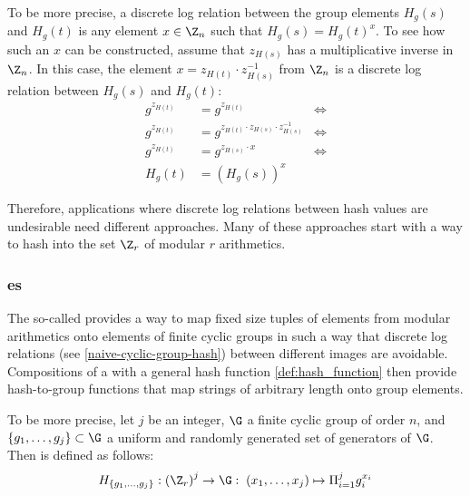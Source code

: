 \begin{example}
To be more precise, a discrete log relation between the group elements $H_g(s)$ and $H_g(t)$ is any element $x\in \Z_n$ such that $H_g(s) = H_g(t)^x$. To see how such an $x$ can be constructed, assume that $z_{H(s)}$ has a multiplicative inverse in $\Z_n$. In this case, the element $x=z_{H(t)}\cdot z_{H(s)}^{-1}$ from $\Z_n$ is a discrete log relation between $H_g(s)$ and $H_g(t)$:
\begin{align*}
g^{z_{H(t)}} & = g^{z_{H(t)}} & \Leftrightarrow\\
g^{z_{H(t)}} & = g^{z_{H(t)}\cdot z_{H(s)}\cdot z_{H(s)}^{-1}} & \Leftrightarrow \\
g^{z_{H(t)}} & = g^{z_{H(s)}\cdot x} & \Leftrightarrow \\
H_g(t) & = (H_g(s))^x
\end{align*}
\end{example}
Therefore, applications where discrete log relations between hash values are undesirable need different approaches. Many of these approaches start with a way to hash into the set $\Z_r$ of modular $r$ arithmetics.

\subsubsection{es}
\label{def:Pedersen_hash}
The so-called  \citep{Pedersen92} provides a way to map fixed size tuples of elements from modular arithmetics onto elements of finite cyclic groups in such a way that discrete log relations (see \examplename{} \ref{naive-cyclic-group-hash}) between different images are avoidable. Compositions of a  with a general hash function \eqref{def:hash_function} then provide hash-to-group functions that map strings of arbitrary length onto group elements.

To be more precise, let $j$ be an integer, $\G$ a finite cyclic group of order $n$, and $\{g_1, \ldots, g_j\} \subset \G$ a uniform and randomly generated set of generators of $\G$. Then  is defined as follows:
\begin{equation}\label{eq:Pedersen_hash}
H_{\{g_1,\ldots,g_j\}} : \left(\Z_r\right)^j \to \G:\; (x_1,\ldots,x_j)\mapsto \Pi_{i=1}^j g_i^{x_i}
\end{equation}

